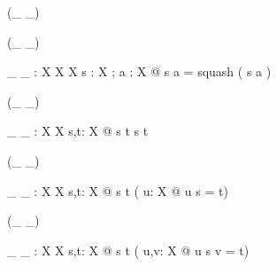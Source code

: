 
\begin{zed}
 \rightassoc (\_ \extract \_)
\end{zed}


\begin{zed}
 \leftassoc (\_ \filter \_)
\end{zed}

\begin{gendef}[X]
\_ \filter \_ : \seq X \cross \power X \fun \seq X
\where
\forall s : \seq X ; a : \power X @
	s \filter a = squash ( s \rres a )
\end{gendef}

\begin{zed}
\relation (\_ \prefix \_)
\end{zed}

\begin{gendef}[X]
\_ \prefix \_ : \seq X \rel \seq X
\where
\forall s,t: \seq X @
s \prefix t \iff s \subseteq t
\end{gendef}

\begin{zed}
\relation (\_ \suffix \_)
\end{zed}

\begin{gendef}[X]
\_ \suffix \_ : \seq X \rel \seq X
\where
\forall s,t: \seq X @
s \suffix t \iff ( \exists u: \seq X @ u \cat s = t)
\end{gendef}

\begin{zed}
\relation (\_ \infix \_)
\end{zed}

\begin{gendef}[X]
\_ \infix \_ : \seq X \rel \seq X
\where
\forall s,t: \seq X @
s \infix t \iff ( \exists u,v: \seq X @ u \cat s \cat v = t)
\end{gendef}

